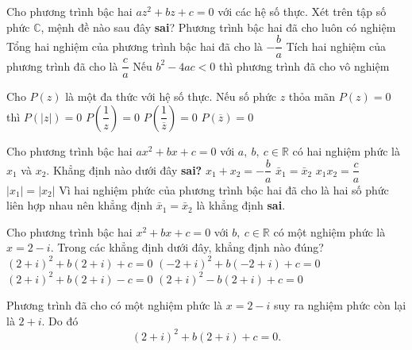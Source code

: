 \begin{ex}%
	Cho phương trình bậc hai $ az^2+bz+c=0 $ với các hệ số thực. Xét trên tập số phức $\mathbb{C}$, mệnh đề nào sau đây \textbf{sai}?
	\choice
	{Phương trình bậc hai đã cho luôn có nghiệm}
	{Tổng hai nghiệm của phương trình bậc hai đã cho là $ -\dfrac{b}{a} $}
	{Tích hai nghiệm của phương trình đã cho là $ \dfrac{c}{a} $}
	{\True Nếu $ b^2-4ac < 0 $ thì phương trình đã cho vô nghiệm}
\end{ex}

\begin{ex}%
	Cho $ P(z) $ là một đa thức với hệ số thực. Nếu số phức $ z $ thỏa mãn $ P(z)=0 $ thì 
	\choice
	{$ P(|z|)=0 $}
	{$ P\left(\dfrac{1}{z}\right)=0 $}
	{$ P\left(\dfrac{1}{\overline{z}}\right)=0 $}
	{\True $ P(\overline{z}) =0$}
\end{ex}

\begin{ex}%
	Cho phương trình bậc hai $ax^2+bx+c=0$ với $a,~b,~c\in \mathbb{R}$ có hai nghiệm phức là $x_1$ và $x_2$. Khẳng định nào dưới đây \textbf{sai?}
	\choice
	{$x_1+x_2=-\dfrac{b}{a}$}
	{\True $\bar{x}_1=\bar{x}_2$}
	{$x_1 x_2=\dfrac{c}{a}$}
	{$|x_1|=|x_2|$}
	\loigiai
	{
		Vì hai nghiệm phức của phương trình bậc hai đã cho là hai số phức liên hợp nhau nên khẳng định $\bar{x}_1=\bar{x}_2$ là khẳng định \textbf{sai}.
	}
\end{ex}

\begin{ex}%
	Cho phương trình bậc hai $x^2+bx+c=0$ với $b,~c\in\mathbb{R}$ có một nghiệm phức là $x=2-i$. Trong các khẳng định dưới đây, khẳng định nào đúng?
	\choice
	{\True $(2+i)^2+b(2+i)+c=0$}
	{$(-2+i)^2+b(-2+i)+c=0$}
	{$(2+i)^2+b(2+i)-c=0$}
	{$(2+i)^2-b(2+i)+c=0$}
	\loigiai
	{
		Phương trình đã cho có một nghiệm phức là $x=2-i$ suy ra nghiệm phức còn lại là $2+i$. Do đó
		\[(2+i)^2+b(2+i)+c=0.\]
		
	}
\end{ex}

